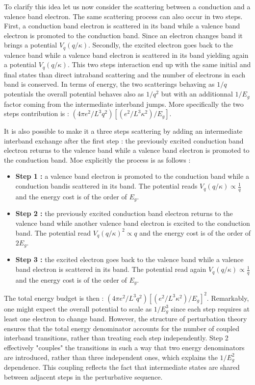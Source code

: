 To clarify this idea let us now consider the scattering between a conduction and a valence band electron. 
The same scattering process can also occur in two steps. First, a conduction band electron is scattered in its band while a valence band electron is promoted to the conduction band. Since an electron changes band it brings a potential $V_q(q/\kappa)$. Secondly, 
 the excited electron goes back to the valence band while a valence band electron is scattered in its band yielding again a potential $V_q(q/\kappa)$. This two steps interaction end up with the same initial and final states than direct intraband scattering and the number of electrons in each band is conserved.  
In terms of energy, the two scatterings behaving as $1/q$ potentials the overall potential behaves also as $1/q^2$ but with an additionnal $1/E_{g}$ factor coming from the intermediate interband jumps. More specifically the two steps contribution is : $\left( 4\pi e^2/L^3q^2 \right)\left[ (e^2/L^3\kappa^2)/E_{g}\right]$.  

\bigskip
It is also possible to make it a three steps scattering by adding an intermediate interband exchange after the first step : the previously excited conduction band electron returns to the valence band while a valence band electron is promoted to the conduction band. 
Moe explicitly the process is as follows : 

\begin{itemize}
    \item \textbf{Step 1 :} a valence band electron is promoted to the conduction band while a conduction bandis scattered in its band. The potential reads $V_q(q/\kappa) \propto \frac{1}{q}$ and the energy cost is of the order of $E_g$.
    \item \textbf{Step 2 :} the previously excited conduction band electron returns to the valence band while another valence band electron is excited to the conduction band. The potential read $V_q(q/\kappa)^2 \propto q$ and the energy cost is of the order of $2E_g$.
    \item \textbf{Step 3 :} the excited electron goes back to the valence band while a valence band electron is scattered in its band. The potential read again $V_q(q/\kappa) \propto \frac{1}{q}$ and the energy cost is of the order of $E_g$.
\end{itemize}

\noindent The total energy budget is then : $\left( 4\pi e^2/L^3q^2 \right)\left[ (e^2/L^3\kappa^2)/E_{g}\right]^2$. Remarkably, one might expect the overall potential to scale as $1/E_g^3$  since each step requires at least one electron to change band. However, the structure of perturbation theory ensures that the total energy denominator accounts for the number of coupled interband transitions, rather than treating each step independently. 
Step 2 effectively "couples" the transitions in such a way that two energy denominators are introduced, rather than three independent ones, which explains the 
$1/E_g^2$ dependence. This coupling reflects the fact that intermediate states are shared between adjacent steps in the perturbative sequence.
\bigskip 


